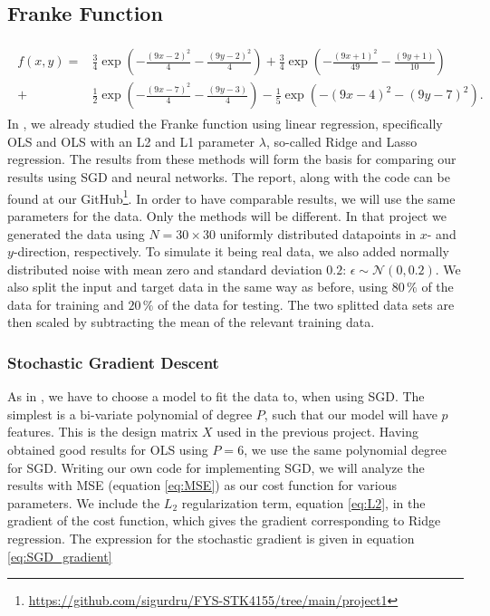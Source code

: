 \documentclass[12pt]{extarticle}
\begin{document}
\subsection{Franke Function}
\begin{align}
	\begin{split}\label{eq:FF}
		f(x,y) = &\frac{3}{4}\exp(-\frac{(9x -2)^2}{4} - \frac{(9y-2)^2}{4}) + \frac{3}{4}\exp(-\frac{(9x + 1)^2}{49} - \frac{(9y + 1)}{10})
		\\
		+ &\frac{1}{2}\exp(-\frac{(9x-7)^2}{4} - \frac{(9y -3)}{4}) - \frac{1}{5}\exp(-(9x-4)^2 - (9y-7)^2).
	\end{split}
\end{align}
In \cite{project1}, we already studied the Franke function using linear regression, specifically OLS and OLS with an L2 and L1 parameter $\lambda$, so-called Ridge and Lasso regression. The results from these methods will form the basis for comparing our results using SGD and neural networks. The report, along with the code can be found at our GitHub\footnote{\href{https://github.com/sigurdru/FYS-STK4155/tree/main/project1}{https://github.com/sigurdru/FYS-STK4155/tree/main/project1}}. In order to have comparable results, we will use the same parameters for the data. Only the methods will be different. In that project we generated the data using $N=30\times30$ uniformly distributed datapoints in $x$- and $y$-direction, respectively. To simulate it being real data, we also added normally distributed noise with mean zero and standard deviation $0.2$: $\epsilon \sim \mathcal{N}(0,0.2)$. We also split the input and target data in the same way as before, using $80\,\%$ of the data for training and $20\,\%$ of the data for testing. The two splitted data sets are then scaled by subtracting the mean of the relevant training data.

\subsubsection{Stochastic Gradient Descent}
As in \cite{project1}, we have to choose a model to fit the data to, when using SGD. The simplest is a bi-variate polynomial of degree $P$, such that our model will have $p$ features. This is the design matrix $X$ used in the previous project. Having obtained good results for OLS using $P = 6$, we use the same polynomial degree for SGD. Writing our own code for implementing SGD, we will analyze the results with MSE (equation \eqref{eq:MSE}) as our cost function for various parameters. We include the $L_2$ regularization term, equation \eqref{eq:L2}, in the gradient of the cost function, which gives the gradient corresponding to Ridge regression. The expression for the stochastic gradient is given in equation \eqref{eq:SGD_gradient}
\end{document}
